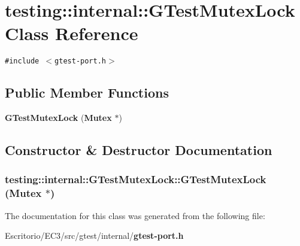 \section{testing::internal::GTestMutexLock Class Reference}
\label{classtesting_1_1internal_1_1GTestMutexLock}
{\tt \#include $<$gtest-port.h$>$}

\subsection*{Public Member Functions}
\begin{CompactItemize}
\item 
{\bf GTestMutexLock} ({\bf Mutex} $\ast$)
\end{CompactItemize}


\subsection{Constructor \& Destructor Documentation}
\subsubsection{\setlength{\rightskip}{0pt plus 5cm}testing::internal::GTestMutexLock::GTestMutexLock ({\bf Mutex} $\ast$)\hspace{0.3cm}{\tt  [inline, explicit]}}\label{classtesting_1_1internal_1_1GTestMutexLock_74c62a9202553b78ab28c216f98c4e72}




The documentation for this class was generated from the following file:\begin{CompactItemize}
\item 
Escritorio/EC3/src/gtest/internal/{\bf gtest-port.h}\end{CompactItemize}
